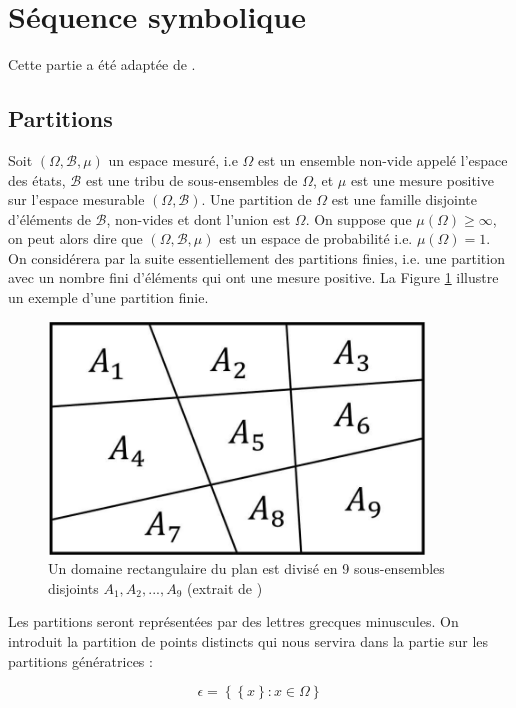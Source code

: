 \section*{Séquence symbolique}

Cette partie a été adaptée de \cite{3}.

\subsection*{Partitions}

Soit $(\Omega,\mathcal{B},\mu)$ un espace mesuré, i.e $\Omega$ est un ensemble non-vide appelé l'espace des états, $\mathcal{B}$ est une tribu de sous-ensembles de $\Omega$, et $\mu$ est une mesure positive sur l'espace mesurable $(\Omega,\mathcal{B})$. Une partition de $\Omega$ est une famille disjointe d'éléments de $\mathcal{B}$, non-vides et dont l'union est $\Omega$.
On suppose que $\mu(\Omega) \geq\infty$, on peut alors dire que $(\Omega,\mathcal{B},\mu)$ est un espace de probabilité i.e. $\mu(\Omega)=1$.
On considérera par la suite essentiellement des partitions finies, i.e. une partition avec un nombre fini d'éléments qui ont une mesure positive. La Figure \ref{fig7.1} illustre un exemple d'une partition finie.

\begin{figure}[!ht]
    \centering
    \includegraphics[width=10cm]{illustration_partition.png}
    \caption{Un domaine rectangulaire du plan est divisé en 9 sous-ensembles disjoints $A_1, A_2,..., A_9$ (extrait de \cite{3})}
    \label{fig7.1}
\end{figure} 

\vspace{2ex}
Les partitions seront représentées par des lettres grecques minuscules. On introduit la partition de points distincts qui nous servira dans la partie sur les partitions génératrices :

\begin{equation}
    \epsilon = \left\{\left\{x\right\} : x \in \Omega \right\}
\end{equation}

